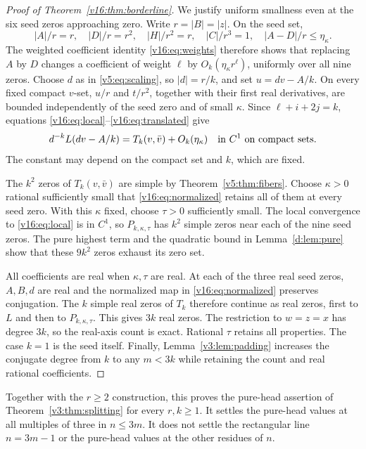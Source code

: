 \documentclass[UTF8,11pt]{ctexart}
\theoremstyle{definition}
\numberwithin{equation}{section}
\begin{document}
\begin{proof}[Proof of Theorem~\ref{v16:thm:borderline}]
We justify uniform smallness even at the six seed zeros approaching
zero. Write $r=|B|=|z|$. On the seed set,
\[
 |A|/r=r,\quad |D|/r=r^2,\quad |H|/r^2=r,
 \quad |C|/r^3=1,\quad |A-D|/r\le\eta_\kappa.
\]
The weighted coefficient identity \eqref{v16:eq:weights} therefore
shows that replacing $A$ by $D$ changes a coefficient of weight
$\ell$ by $O_k(\eta_\kappa r^\ell)$, uniformly over all nine
zeros. Choose $d$ as in \eqref{v5:eq:scaling}, so $|d|=r/k$,
and set $u=dv-A/k$. On every fixed compact $v$-set, $u/r$ and
$t/r^2$, together with their first real derivatives, are bounded
independently of the seed zero and of small $\kappa$.
Since $\ell+i+2j=k$, equations
\eqref{v16:eq:local}--\eqref{v16:eq:translated} give
\begin{equation}\label{v16:eq:normalized}
 d^{-k}L(dv-A/k)=T_k(v,\bar v)+O_k(\eta_\kappa)
 \quad\hbox{in }C^1\hbox{ on compact sets}.
\end{equation}
The constant may depend on the compact set and $k$, which are fixed.

The $k^2$ zeros of $T_k(v,\bar v)$ are simple by
Theorem~\ref{v5:thm:fibers}. Choose $\kappa>0$ rational sufficiently
small that \eqref{v16:eq:normalized} retains all of them at every
seed zero. With this $\kappa$ fixed, choose $\tau>0$ sufficiently
small. The local convergence to \eqref{v16:eq:local} is in $C^1$,
so $P_{k,\kappa,\tau}$ has $k^2$ simple zeros near each of the nine
seed zeros. The pure highest term and the quadratic bound in
Lemma~\ref{d:lem:pure} show that these $9k^2$ zeros exhaust its
zero set.

All coefficients are real when $\kappa,\tau$ are real. At each
of the three real seed zeros, $A,B,d$ are real and the normalized
map in \eqref{v16:eq:normalized} preserves conjugation. The $k$
simple real zeros of $T_k$ therefore continue as real zeros,
first to $L$ and then to $P_{k,\kappa,\tau}$. This gives $3k$
real zeros. The restriction to $w=z=x$ has degree $3k$, so the
real-axis count is exact. Rational $\tau$ retains all properties.
The case $k=1$ is the seed itself. Finally,
Lemma~\ref{v3:lem:padding} increases the conjugate degree from $k$
to any $m<3k$ while retaining the count and real rational coefficients.
\end{proof}

Together with the $r\ge2$ construction, this proves the pure-head
assertion of Theorem~\ref{v3:thm:splitting} for every $r,k\ge1$.
It settles the pure-head values at all multiples of three in
$n\le3m$. It does not settle the rectangular line $n=3m-1$ or
the pure-head values at the other residues of $n$.
\end{document}
